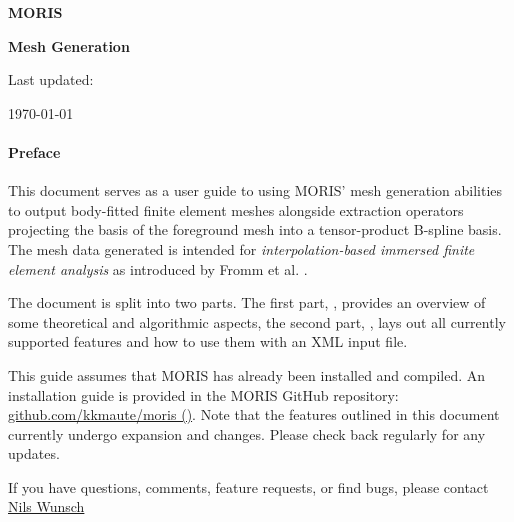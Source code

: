 
\newpage
\thispagestyle{empty}

\vspace{3.0cm}

\bigskip
\centerline{ \Large{ \textbf{ MORIS }}} 
\vspace{0.3cm}
\centerline{ \Large{ \textbf{ Mesh Generation }}}


\vspace{1.0cm}

\begin{center}
	\centerline{Last updated:} 
    \today
\end{center}


\vspace{1.6cm}

\paragraph{Preface}
This document serves as a user guide to using MORIS' mesh generation abilities to output body-fitted finite element meshes alongside extraction operators projecting the basis of the foreground mesh into a tensor-product B-spline basis. The mesh data generated is intended for \emph{interpolation-based immersed finite element analysis} as introduced by Fromm et al. \cite{Fromm2022}. 

The document is split into two parts. The first part, ,  provides an overview of some theoretical and algorithmic aspects, the second part, , lays out all currently supported features and how to use them with an \textsc{XML} input file. 

This guide assumes that MORIS has already been installed and compiled. An installation guide is provided in the MORIS GitHub repository:
\href{https://github.com/kkmaute/moris/tree/main/share/install}{github.com/kkmaute/moris (\ExternalLink)}.
Note that the features outlined in this document currently undergo expansion and changes. Please check back regularly for any updates.

If you have questions, comments, feature requests, or find bugs, please contact \href{mailto:nils.wunsch@colorado.com}{Nils Wunsch \Letter}


